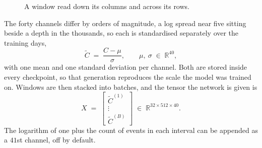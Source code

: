 \documentclass[10pt,a4paper]{article}
\begin{document}
\begin{figure}[H]
\centering
{}
\caption{A window read down its columns and across its rows.}
\label{fig:grid}
\end{figure}

The forty channels differ by orders of magnitude, a log spread near five
sitting beside a depth in the thousands, so each is standardised separately
over the training days,
%
\begin{equation}
\widetilde{C} \;=\; \frac{C-\mu}{\sigma}, \qquad \mu,\ \sigma \;\in\; \mathbb{R}^{40},
\label{eq:norm}
\end{equation}
%
with one mean and one standard deviation per channel. Both are stored inside
every checkpoint, so that generation reproduces the scale the model was trained
on. Windows are then stacked into batches, and the tensor the network is given
is
%
\begin{equation}
X \;=\;
\begin{bmatrix} \widetilde{C}^{(1)} \\[1pt] \vdots \\[1pt] \widetilde{C}^{(B)} \end{bmatrix}
\;\in\; \mathbb{R}^{32\times 512\times 40}.
\label{eq:tensor}
\end{equation}
%
The logarithm of one plus the count of events in each interval can be appended
as a $41$st channel, off by default.
\end{document}
